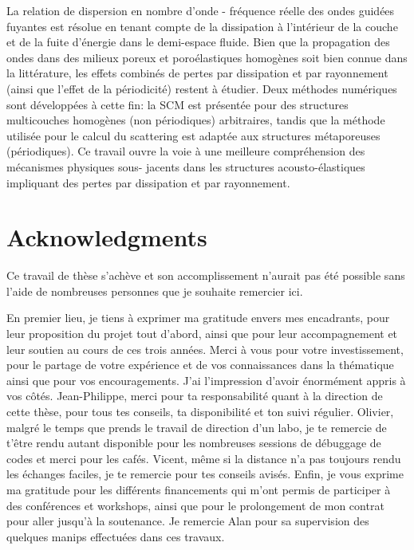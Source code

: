La relation de dispersion en nombre d'onde - fréquence réelle des ondes guidées fuyantes est résolue en tenant compte de la dissipation à l'intérieur de la couche et de la fuite d'énergie dans le demi-espace fluide. Bien que la propagation des ondes dans des milieux poreux et poroélastiques homogènes soit bien connue dans la littérature, les effets combinés de pertes par dissipation et par rayonnement (ainsi que l’effet de la périodicité) restent à étudier. Deux méthodes numériques sont développées à cette fin: la SCM est présentée pour des structures multicouches homogènes (non périodiques) arbitraires, tandis que la méthode utilisée pour le calcul du scattering est adaptée aux structures métaporeuses (périodiques). Ce travail ouvre la voie à une meilleure compréhension des mécanismes physiques sous- jacents dans les structures acousto-élastiques impliquant des pertes par dissipation et par rayonnement.

\endgroup
    \chapter*{Acknowledgments}

\vspace*{-8mm}

Ce travail de thèse s'achève et son accomplissement n'aurait pas été possible sans l'aide de nombreuses personnes que je souhaite remercier ici. 

En premier lieu, je tiens à exprimer ma gratitude envers mes encadrants, pour leur proposition du projet tout d'abord, ainsi que pour leur accompagnement et leur soutien au cours de ces trois années. Merci à vous pour votre investissement, pour le partage de votre expérience et de vos connaissances dans la thématique ainsi que pour vos encouragements. J'ai l'impression d'avoir énormément appris à vos côtés. Jean-Philippe, merci pour ta responsabilité quant à la direction de cette thèse, pour tous tes conseils, ta disponibilité et ton suivi régulier. Olivier, malgré le temps que prends le travail de direction d'un labo, je te remercie de t'être rendu autant disponible pour les nombreuses sessions de débuggage de codes et merci pour les cafés. Vicent, même si la distance n'a pas toujours rendu les échanges faciles, je te remercie pour tes conseils avisés. Enfin, je vous exprime ma gratitude pour les différents financements qui m'ont permis de participer à des conférences et workshops, ainsi que pour le prolongement de mon contrat pour aller jusqu'à la soutenance. Je remercie Alan pour sa supervision des quelques manips effectuées dans ces travaux.\\

